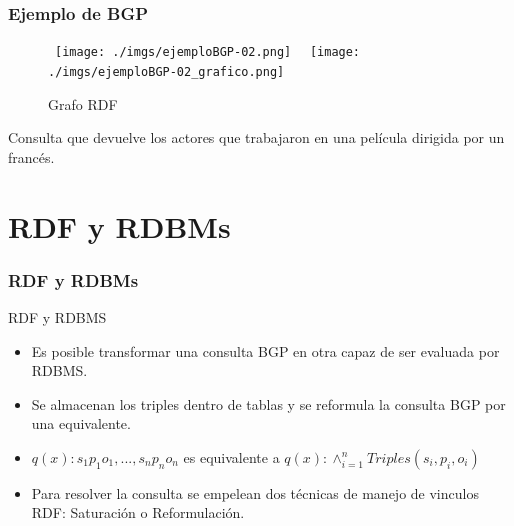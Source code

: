 \documentclass{beamer}
\begin{document}
\begin{frame}
\frametitle{Ejemplo de BGP}
\begin{figure}
        \hbox{%
                \texttt{[image: ./imgs/ejemploBGP-02.png]}%
        }%
        \hbox{%
                \texttt{[image: ./imgs/ejemploBGP-02\_grafico.png]}%
        }%
        \ifdim\ht0>\ht2
                \setbox0\hbox{%
                        \texttt{[image: ./imgs/ejemploBGP-02.png]}%
                }%
        \else
                \setbox2\hbox{%
                        \texttt{[image: ./imgs/ejemploBGP-02\_grafico.png]}%
                }%
        \fi
        \noindent
        \parbox{.45\textwidth}{%
                \centering
                \caption{Consulta RDF}
                \label{fg:methods}
        }%
        \hfil
        \parbox{.45\textwidth}{%
                \centering
                \caption{Grafo RDF}
                \label{fg:method_detail}
        }%
\end{figure}
\vspace*{1.2cm}
Consulta que devuelve los actores que trabajaron en una película dirigida por un francés.
\end{frame}

\section{RDF y RDBMs}
\begin{frame}
\frametitle{RDF y RDBMs}
\begin{block}{RDF y RDBMS}
\begin{itemize}
\item{Es posible transformar una consulta BGP en otra capaz de ser evaluada por RDBMS.}
\item{Se almacenan los triples dentro de tablas y se reformula la consulta BGP por una equivalente.}
\item{$q(x) : s_{1} p_{1} o_{1}, ..., s_{n} p_{n} o_{n}$ es equivalente a $q(x): \wedge ^n _{i = 1} Triples(s_{i}, p_{i}, o_{i})$}
\item{Para resolver la consulta se empelean dos técnicas de manejo de vinculos RDF: Saturación o Reformulación.}
\end{itemize}
\end{block}
\end{frame}
\end{document}
